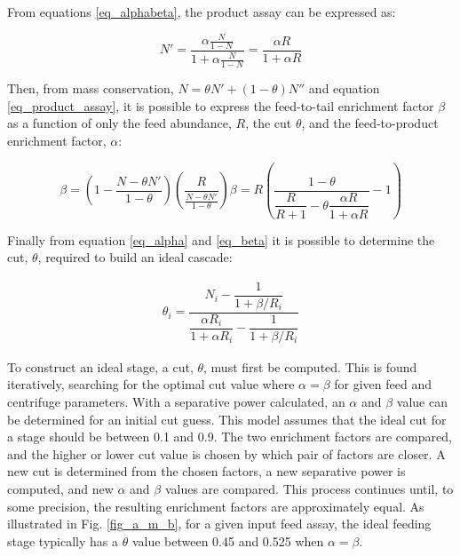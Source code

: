 From equations \eqref{eq_alphabeta}, the product assay can be expressed as:

\begin{equation}\label{eq_product_assay}
    N' = \frac{\alpha \frac{N}{1-N}}{1+\alpha \frac{N}{1-N}} = \frac{\alpha R}{1 + \alpha R}
\end {equation}


Then, from mass conservation, $N = \theta N' + (1-\theta)N''$ and equation
\eqref{eq_product_assay}, it is possible to express the feed-to-tail enrichment factor $\beta$ as a function of only the feed abundance, $R$, the cut $\theta$, and the feed-to-product enrichment factor, $\alpha$:

\begin{subequations}
    \begin{equation}\label{eq_beta_interim}
        \beta = \left( 1 - \frac{N - \theta N'}{1-\theta} \right)
                        \left( \frac{R}{\frac{N - \theta N'}{1 - \theta}} \right)
    \end{equation}
    \begin{equation}\label{eq_beta}
        \beta =   R \left(\dfrac{1-\theta}
                        {\dfrac{R}{R+1}- \theta \dfrac{\alpha R}{1+\alpha R}} -1\right)
    \end{equation}
\end{subequations}

Finally from equation \eqref{eq_alpha} and \eqref{eq_beta} it is possible to
determine the cut, $\theta$, required to build an ideal cascade:

\begin{eqnarray}
    \theta_{i} = \dfrac{N_{i} - \dfrac{1}{1 + \beta/R_{i}}}{ \dfrac{\alpha R_{i}}{1 + \alpha R_{i}} -
           \dfrac{1}{1 + \beta/R_{i}}}
           \label{eq_theta}
\end{eqnarray}


To construct an ideal stage, a cut, $\theta$, must first be computed.
This is found iteratively, searching for the optimal cut value where $\alpha = \beta$
for given feed and centrifuge parameters. With a separative power calculated,
an $\alpha$ and $\beta$ value can be determined for an initial cut guess. This
model assumes that the ideal cut for a stage should be between 0.1 and 0.9. The
two enrichment factors are compared, and the higher or lower cut value is chosen
by which pair of factors are closer. A new cut is determined from the chosen
factors, a new separative power is computed, and new $\alpha$ and $\beta$ values
are compared. This process continues until, to some precision, the resulting
enrichment factors are approximately equal. As illustrated in Fig. \ref{fig_a_m_b},
for a given input feed assay, the ideal feeding stage typically has a $\theta$
value between 0.45 and 0.525 when $\alpha = \beta$.

